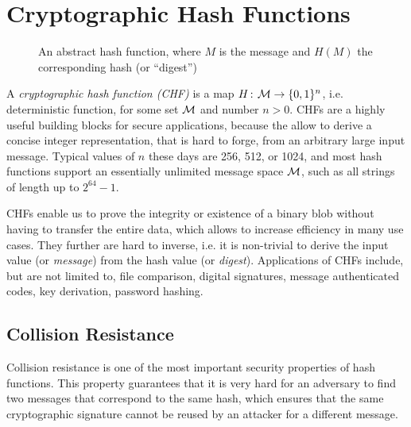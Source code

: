 \section{Cryptographic Hash Functions}
\label{sec:hashfunctions}

\begin{figure}
  \centering
    \caption{An abstract hash function, where $M$ is the message and $H(M)$ the corresponding hash (or ``digest'')}
\label{fig:hash-function}
\end{figure}

A \emph{cryptographic hash function (CHF)} is a map $H{{\kern .05em}\colon{\kern .05em}}{\cal M}\rightarrow\{0,1\}^n$, i.e. deterministic function, for
some set ${\cal M}$ and number $n > 0$. 
CHFs are a highly useful building blocks for secure applications, because the allow to derive a concise integer representation, that is hard to forge, from an arbitrary large input message.
Typical values of $n$ these days are 256, 512, or 1024, and most hash functions support an essentially unlimited message space ${\cal M}$, such as all strings of length up to $2^{64}-1$.

CHFs enable us to prove the integrity or existence of a binary blob without having to transfer the entire data, which allows to increase efficiency in many use cases. They further are hard to inverse, i.e. it is non-trivial to derive the input value (or \emph{message}) from the hash value (or \emph{digest}).
Applications of CHFs include, but are not limited to, file comparison, digital signatures, message authenticated codes, key derivation, password hashing.

\subsection{Collision Resistance}
Collision resistance is one of the most important security properties of hash functions.
This property guarantees that it is very hard for an adversary to find two messages that correspond to the same hash, which ensures that the same cryptographic signature cannot be reused by an attacker for a different message.

